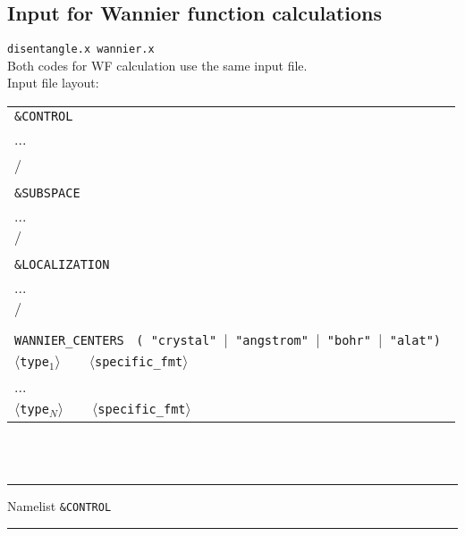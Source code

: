 \subsection{Input for Wannier function calculations}
 {\tt disentangle.x wannier.x}\\
\noindent Both codes for WF calculation use the same input file.\\

\noindent Input file layout: \\

%
%
\begin{tabular}{l}
{\tt \&CONTROL }\\
   ... \\
  / \\
  \\
{\tt \&SUBSPACE }\\
   ... \\
  $/$ \\
  \\
{\tt \&LOCALIZATION }\\
   ... \\
  $/$ \\
  \\
{\tt  WANNIER\_CENTERS } {\tt ( "crystal" $\mid$ "angstrom" $\mid$ "bohr" $\mid$ "alat") }\\
  $\langle${\tt type}$_1\rangle \qquad    \langle${\tt specific\_fmt}$\rangle$ \\
  ... \\
  $\langle${\tt type}$_N\rangle \qquad    \langle${\tt specific\_fmt}$\rangle$
\end{tabular}
%
%
\\
\\

\begin{centering}
\rule{2.2in}{0.01in} Namelist {\tt \&CONTROL } \rule{2.2in}{0.01in}
\end{centering}\\

